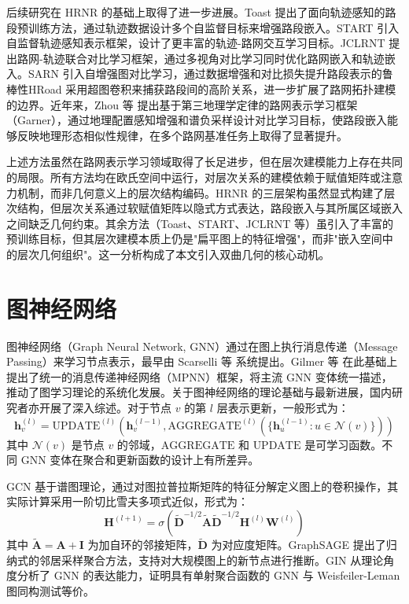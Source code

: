 后续研究在 HRNR 的基础上取得了进一步进展。Toast\cite{chen2021toast} 提出了面向轨迹感知的路段预训练方法，通过轨迹数据设计多个自监督目标来增强路段嵌入。START\cite{chen2022start} 引入自监督轨迹感知表示框架，设计了更丰富的轨迹-路网交互学习目标。JCLRNT\cite{mao2022jclrnt} 提出路网-轨迹联合对比学习框架，通过多视角对比学习同时优化路网嵌入和轨迹嵌入。SARN\cite{li2023sarn} 引入自增强图对比学习，通过数据增强和对比损失提升路段表示的鲁棒性HRoad\cite{lin2023hroad} 采用超图卷积来捕获路段间的高阶关系，进一步扩展了路网拓扑建模的边界。近年来，Zhou 等\cite{zhou2024garner} 提出基于第三地理学定律的路网表示学习框架（Garner），通过地理配置感知增强和谱负采样设计对比学习目标，使路段嵌入能够反映地理形态相似性规律，在多个路网基准任务上取得了显著提升。

上述方法虽然在路网表示学习领域取得了长足进步，但在层次建模能力上存在共同的局限。所有方法均在欧氏空间中运行，对层次关系的建模依赖于赋值矩阵或注意力机制，而非几何意义上的层次结构编码。HRNR 的三层架构虽然显式构建了层次结构，但层次关系通过软赋值矩阵以隐式方式表达，路段嵌入与其所属区域嵌入之间缺乏几何约束。其余方法（Toast、START、JCLRNT 等）虽引入了丰富的预训练目标，但其层次建模本质上仍是"扁平图上的特征增强"，而非"嵌入空间中的层次几何组织"。这一分析构成了本文引入双曲几何的核心动机。

\section{图神经网络}

图神经网络（Graph Neural Network, GNN）通过在图上执行消息传递（Message Passing）来学习节点表示，最早由 Scarselli 等\cite{scarselli2009gnn} 系统提出。Gilmer 等\cite{gilmer2017mpnn} 在此基础上提出了统一的消息传递神经网络（MPNN）框架，将主流 GNN 变体统一描述，推动了图学习理论的系统化发展。关于图神经网络的理论基础与最新进展，国内研究者亦开展了深入综述\cite{ma2022gnn_survey_cn,xu2020gcn_survey_cn,zhao2022large_gnn_cn}。对于节点 $v$ 的第 $l$ 层表示更新，一般形式为：
\begin{equation}
    \mathbf{h}_v^{(l)} = \text{UPDATE}^{(l)}\left(\mathbf{h}_v^{(l-1)}, \text{AGGREGATE}^{(l)}\left(\{\mathbf{h}_u^{(l-1)} : u \in \mathcal{N}(v)\}\right)\right)
\end{equation}
其中 $\mathcal{N}(v)$ 是节点 $v$ 的邻域，$\text{AGGREGATE}$ 和 $\text{UPDATE}$ 是可学习函数。不同 GNN 变体在聚合和更新函数的设计上有所差异。

GCN\cite{Kipf2017} 基于谱图理论，通过对图拉普拉斯矩阵的特征分解定义图上的卷积操作，其实际计算采用一阶切比雪夫多项式近似，形式为：
\begin{equation}
    \mathbf{H}^{(l+1)} = \sigma\left(\tilde{\mathbf{D}}^{-1/2}\tilde{\mathbf{A}}\tilde{\mathbf{D}}^{-1/2}\mathbf{H}^{(l)}\mathbf{W}^{(l)}\right)
\end{equation}
其中 $\tilde{\mathbf{A}} = \mathbf{A} + \mathbf{I}$ 为加自环的邻接矩阵，$\tilde{\mathbf{D}}$ 为对应度矩阵。GraphSAGE\cite{Hamilton2017} 提出了归纳式的邻居采样聚合方法，支持对大规模图上的新节点进行推断。GIN\cite{Xu2019} 从理论角度分析了 GNN 的表达能力，证明具有单射聚合函数的 GNN 与 Weisfeiler-Leman 图同构测试等价。

